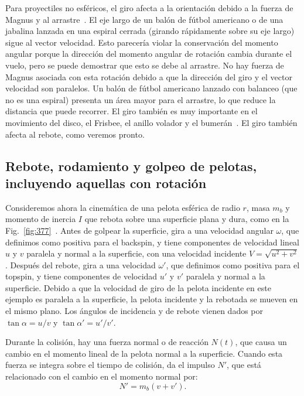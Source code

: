 \documentclass[12pt]{book}
\begin{document}
Para proyectiles no esféricos, el giro afecta a la orientación debido a la fuerza de Magnus y al arrastre~\cite{ref16,ref36,ref60}. El eje largo de un balón de fútbol americano o de una jabalina lanzada en una espiral cerrada (girando rápidamente sobre su eje largo) sigue al vector velocidad. Esto parecería violar la conservación del momento angular porque la dirección del momento angular de rotación cambia durante el vuelo, pero se puede demostrar que esto se debe al arrastre. No hay fuerza de Magnus asociada con esta rotación debido a que la dirección del giro y el vector velocidad son paralelos. Un balón de fútbol americano lanzado con balanceo (que no es una espiral) presenta un área mayor para el arrastre, lo que reduce la distancia que puede recorrer. El giro también es muy importante en el movimiento del disco, el Frisbee, el anillo volador y el bumerán~\cite{ref37}. El giro también afecta al rebote, como veremos pronto.

\subsection{Rebote, rodamiento y golpeo de pelotas, incluyendo aquellas con rotación}

Consideremos ahora la cinemática de una pelota esférica de radio $r$, masa $m_b$ y momento de inercia $I$ que rebota sobre una superficie plana y dura, como en la Fig.~\ref{fig:377}~\cite{ref28,ref36,ref41}. Antes de golpear la superficie, gira a una velocidad angular $\omega$, que definimos como positiva para el backspin, y tiene componentes de velocidad lineal $u$ y $v$ paralela y normal a la superficie, con una velocidad incidente $V = \sqrt{u^2 + v^2}$. Después del rebote, gira a una velocidad $\omega'$, que definimos como positiva para el topspin, y tiene componentes de velocidad $u'$ y $v'$ paralela y normal a la superficie. Debido a que la velocidad de giro de la pelota incidente en este ejemplo es paralela a la superficie, la pelota incidente y la rebotada se mueven en el mismo plano. Los ángulos de incidencia y de rebote vienen dados por $\tan \alpha = u/v$ y $\tan \alpha' = u'/v'$.

Durante la colisión, hay una fuerza normal o de reacción $N(t)$, que causa un cambio en el momento lineal de la pelota normal a la superficie. Cuando esta fuerza se integra sobre el tiempo de colisión, da el impulso $N'$, que está relacionado con el cambio en el momento normal por:
\begin{equation}
N' = m_b (v + v').
\label{eq:3.140}
\end{equation}
\end{document}
